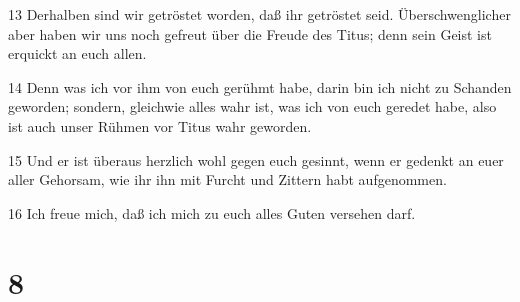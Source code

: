 \par 13 Derhalben sind wir getröstet worden, daß ihr getröstet seid. Überschwenglicher aber haben wir uns noch gefreut über die Freude des Titus; denn sein Geist ist erquickt an euch allen.
\par 14 Denn was ich vor ihm von euch gerühmt habe, darin bin ich nicht zu Schanden geworden; sondern, gleichwie alles wahr ist, was ich von euch geredet habe, also ist auch unser Rühmen vor Titus wahr geworden.
\par 15 Und er ist überaus herzlich wohl gegen euch gesinnt, wenn er gedenkt an euer aller Gehorsam, wie ihr ihn mit Furcht und Zittern habt aufgenommen.
\par 16 Ich freue mich, daß ich mich zu euch alles Guten versehen darf.

\chapter{8}

